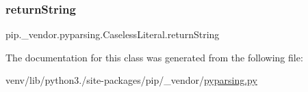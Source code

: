 \subsubsection{\texorpdfstring{return\+String}{returnString}}
{\footnotesize\ttfamily pip.\+\_\+vendor.\+pyparsing.\+Caseless\+Literal.\+return\+String}



The documentation for this class was generated from the following file\+:\begin{DoxyCompactItemize}
\item 
venv/lib/python3./site-\/packages/pip/\+\_\+vendor/\hyperlink{pip_2__vendor_2pyparsing_8py}{pyparsing.\+py}\end{DoxyCompactItemize}
